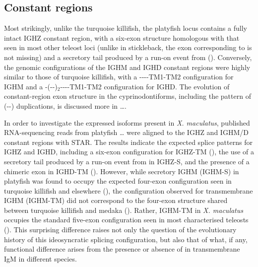 	
	\subsection{Constant regions}
	
	Most strikingly, unlike the turquoise killifish, the platyfish locus contains a fully intact IGHZ constant region, with a six-exon structure homologous with that seen in most other teleost loci (unlike in stickleback, the exon corresponding to  is not missing) and a secretory tail produced by a run-on event from  (). Conversely, the genomic configurations of the IGHM and IGHD constant regions were highly similar to those of turquoise killifish, with a {----TM1-TM2} configuration for IGHM and a {-(--)$_2$----TM1-TM2} configuration for IGHD. The evolution of constant-region exon structure in the cyprinodontiforms, including the pattern of (--) duplications, is discussed more in \dots .
	
	In order to investigate the expressed isoforms present in \textit{X. maculatus}, published RNA-sequencing reads from platyfish \dots %
	were aligned to the IGHZ and IGHM/D constant regions with STAR. %
	The results indicate the expected splice patterns for IGHZ and IGHD, including a six-exon configuration for IGHZ-TM (), the use of a  secretory tail produced by a run-on event from  in IGHZ-S, and the presence of a chimeric  exon in IGHD-TM (). However, while secretory IGHM (IGHM-S) in platyfish was found to occupy the expected four-exon configuration seen in turquoise killifish and elsewhere (), the configuration observed for transmembrane IGHM (IGHM-TM) did not correspond to the four-exon structure shared between turquoise killifish and medaka (). Rather, IGHM-TM in \textit{X. maculatus} occupies the standard five-exon configuration seen in most characterised teleosts (). This surprising difference raises not only the question of the evolutionary history of this ideosyncratic splicing configuration, but also that of what, if any, functional difference arises from the presence or absence of  in transmembrane IgM in different species. %

